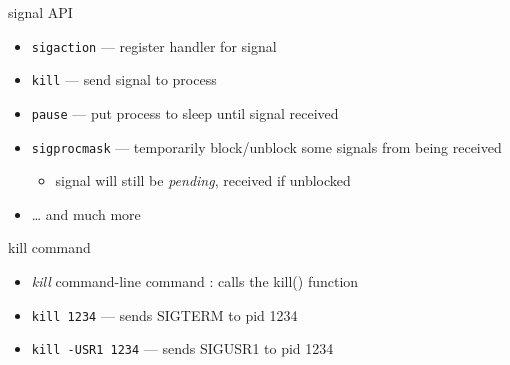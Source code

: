 
\begin{frame}{signal API}
\begin{itemize}
    \item {\tt sigaction} --- register handler for signal
    \item {\tt kill} --- send signal to process
    \item {\tt pause} --- put process to sleep until signal received
    \item {\tt sigprocmask} --- temporarily block/unblock some signals from being received
        \begin{itemize}
        \item signal will still be \textit{pending}, received if unblocked
        \end{itemize}
    \item \ldots{} and much more
\end{itemize}
\end{frame}

\begin{frame}{kill command}
    \begin{itemize}
    \item \textit{kill} command-line command : calls the kill() function
    \item \texttt{kill 1234} --- sends SIGTERM to pid 1234
    \item \texttt{kill -USR1 1234} --- sends SIGUSR1 to pid 1234
    \end{itemize}
\end{frame}
